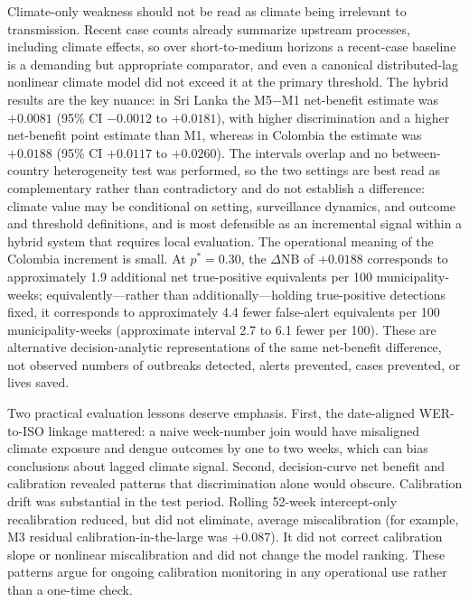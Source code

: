 \documentclass[11pt,a4paper]{article}
\begin{document}
Climate-only weakness should not be read as climate being irrelevant to transmission. Recent case counts already summarize upstream processes, including climate effects, so over short-to-medium horizons a recent-case baseline is a demanding but appropriate comparator, and even a canonical distributed-lag nonlinear climate model did not exceed it at the primary threshold. The hybrid results are the key nuance: in Sri Lanka the M5$-$M1 net-benefit estimate was $+0.0081$ (95\% CI $-0.0012$ to $+0.0181$), with higher discrimination and a higher net-benefit point estimate than M1, whereas in Colombia the estimate was $+0.0188$ (95\% CI $+0.0117$ to $+0.0260$). The intervals overlap and no between-country heterogeneity test was performed, so the two settings are best read as complementary rather than contradictory and do not establish a difference: climate value may be conditional on setting, surveillance dynamics, and outcome and threshold definitions, and is most defensible as an incremental signal within a hybrid system that requires local evaluation. The operational meaning of the Colombia increment is small. At $p^*=0.30$, the $\Delta$NB of $+0.0188$ corresponds to approximately 1.9 additional net true-positive equivalents per 100 municipality-weeks; equivalently---rather than additionally---holding true-positive detections fixed, it corresponds to approximately 4.4 fewer false-alert equivalents per 100 municipality-weeks (approximate interval 2.7 to 6.1 fewer per 100). These are alternative decision-analytic representations of the same net-benefit difference, not observed numbers of outbreaks detected, alerts prevented, cases prevented, or lives saved.

Two practical evaluation lessons deserve emphasis. First, the date-aligned WER-to-ISO linkage mattered: a naive week-number join would have misaligned climate exposure and dengue outcomes by one to two weeks, which can bias conclusions about lagged climate signal. Second, decision-curve net benefit and calibration revealed patterns that discrimination alone would obscure. Calibration drift was substantial in the test period. Rolling 52-week intercept-only recalibration reduced, but did not eliminate, average miscalibration (for example, M3 residual calibration-in-the-large was $+0.087$). It did not correct calibration slope or nonlinear miscalibration and did not change the model ranking. These patterns argue for ongoing calibration monitoring in any operational use rather than a one-time check.
\end{document}
